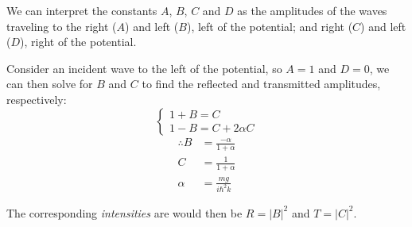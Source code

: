\documentclass[a4paper]{scrartcl}
\begin{document}
We can interpret the constants \(A\), \(B\), \(C\) and \(D\) as the amplitudes of the waves traveling to the right (\(A\)) and left (\(B\)), left of the potential; and right (\(C\)) and left (\(D\)), right of the potential.

Consider an incident wave to the left of the potential, so \(A = 1\) and \(D = 0\), we can then solve for \(B\) and \(C\) to find the reflected and transmitted amplitudes, respectively:
\[\begin{cases}
    1 + B = C \\
    1 - B = C + 2 \alpha C
\end{cases}\]
\begin{align*}
    \therefore B &= \frac{-\alpha}{1 + \alpha} \\
    C &= \frac{1}{1 + \alpha} \\
    \alpha &= \frac{m g}{i \hbar^2 k}
\end{align*}

The corresponding \emph{intensities} are would then be \(R = |B|^2\) and \(T = |C|^2\).
\end{document}
